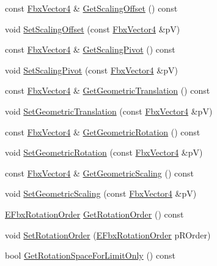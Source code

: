 \begin{DoxyCompactItemize}
\item 
const \hyperlink{class_fbx_vector4}{Fbx\+Vector4} \& \hyperlink{class_fbx_node_1_1_pivot_a9822cb96fdceb2b02e6ac9ba721ceb5c}{Get\+Scaling\+Offset} () const
\item 
void \hyperlink{class_fbx_node_1_1_pivot_a273362006b888000b93d209560b625ff}{Set\+Scaling\+Offset} (const \hyperlink{class_fbx_vector4}{Fbx\+Vector4} \&pV)
\item 
const \hyperlink{class_fbx_vector4}{Fbx\+Vector4} \& \hyperlink{class_fbx_node_1_1_pivot_a82eed97aae88d20e5e56732038514941}{Get\+Scaling\+Pivot} () const
\item 
void \hyperlink{class_fbx_node_1_1_pivot_a176e212079d82a5924f68e3d575c73e4}{Set\+Scaling\+Pivot} (const \hyperlink{class_fbx_vector4}{Fbx\+Vector4} \&pV)
\item 
const \hyperlink{class_fbx_vector4}{Fbx\+Vector4} \& \hyperlink{class_fbx_node_1_1_pivot_a5ef7ba43adfefca3729cde5e54c687fd}{Get\+Geometric\+Translation} () const
\item 
void \hyperlink{class_fbx_node_1_1_pivot_aa0edc14504ff1ea8f6bc611421bb3180}{Set\+Geometric\+Translation} (const \hyperlink{class_fbx_vector4}{Fbx\+Vector4} \&pV)
\item 
const \hyperlink{class_fbx_vector4}{Fbx\+Vector4} \& \hyperlink{class_fbx_node_1_1_pivot_a010ac2796535f1c6aa9df0548129ff29}{Get\+Geometric\+Rotation} () const
\item 
void \hyperlink{class_fbx_node_1_1_pivot_a2dd778bf046aa546e2231e768d564db9}{Set\+Geometric\+Rotation} (const \hyperlink{class_fbx_vector4}{Fbx\+Vector4} \&pV)
\item 
const \hyperlink{class_fbx_vector4}{Fbx\+Vector4} \& \hyperlink{class_fbx_node_1_1_pivot_a613b2b7b073b1f16091c692f3f1f7251}{Get\+Geometric\+Scaling} () const
\item 
void \hyperlink{class_fbx_node_1_1_pivot_afa2b0b729d1f792d6c05a1d935816244}{Set\+Geometric\+Scaling} (const \hyperlink{class_fbx_vector4}{Fbx\+Vector4} \&pV)
\item 
\hyperlink{fbxmath_8h_ae46778666b56bb0abe5992b855fe9332}{E\+Fbx\+Rotation\+Order} \hyperlink{class_fbx_node_1_1_pivot_a14f8b4425c3e20d5f8a05df9cd35abb1}{Get\+Rotation\+Order} () const
\item 
void \hyperlink{class_fbx_node_1_1_pivot_a0ab84ddcb1c5f6e30242c163aafc140c}{Set\+Rotation\+Order} (\hyperlink{fbxmath_8h_ae46778666b56bb0abe5992b855fe9332}{E\+Fbx\+Rotation\+Order} p\+R\+Order)
\item 
bool \hyperlink{class_fbx_node_1_1_pivot_a1dce9501d09b1953b4dc5c97a0517b9f}{Get\+Rotation\+Space\+For\+Limit\+Only} () const

\end{DoxyCompactItemize}
